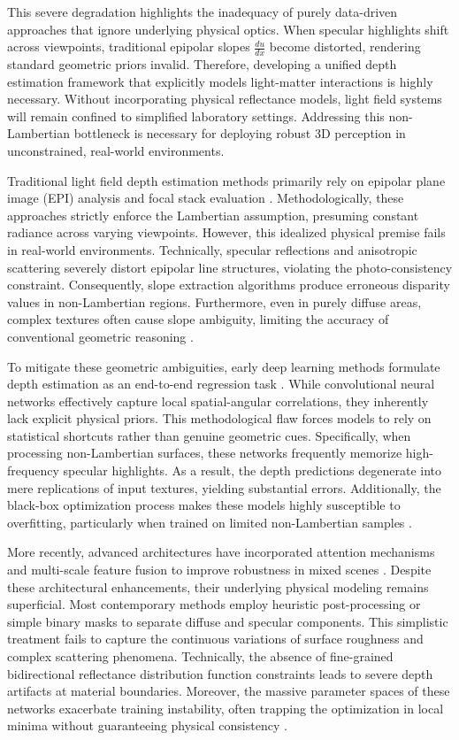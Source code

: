\documentclass[lettersize,journal]{IEEEtran}
\begin{document}
This severe degradation highlights the inadequacy of purely data-driven approaches that ignore underlying physical optics. When specular highlights shift across viewpoints, traditional epipolar slopes $\frac{du}{dx}$ become distorted, rendering standard geometric priors invalid. Therefore, developing a unified depth estimation framework that explicitly models light-matter interactions is highly necessary. Without incorporating physical reflectance models, light field systems will remain confined to simplified laboratory settings. Addressing this non-Lambertian bottleneck is necessary for deploying robust 3D perception in unconstrained, real-world environments.

Traditional light field depth estimation methods primarily rely on epipolar plane image (EPI) analysis and focal stack evaluation \cite{epiepi}. Methodologically, these approaches strictly enforce the Lambertian assumption, presuming constant radiance across varying viewpoints. However, this idealized physical premise fails in real-world environments. Technically, specular reflections and anisotropic scattering severely distort epipolar line structures, violating the photo-consistency constraint. Consequently, slope extraction algorithms produce erroneous disparity values in non-Lambertian regions. Furthermore, even in purely diffuse areas, complex textures often cause slope ambiguity, limiting the accuracy of conventional geometric reasoning \cite{slopeslope}.

To mitigate these geometric ambiguities, early deep learning methods formulate depth estimation as an end-to-end regression task \cite{endend}. While convolutional neural networks effectively capture local spatial-angular correlations, they inherently lack explicit physical priors. This methodological flaw forces models to rely on statistical shortcuts rather than genuine geometric cues. Specifically, when processing non-Lambertian surfaces, these networks frequently memorize high-frequency specular highlights. As a result, the depth predictions degenerate into mere replications of input textures, yielding substantial errors. Additionally, the black-box optimization process makes these models highly susceptible to overfitting, particularly when trained on limited non-Lambertian samples .

More recently, advanced architectures have incorporated attention mechanisms and multi-scale feature fusion to improve robustness in mixed scenes \cite{attentionatten}. Despite these architectural enhancements, their underlying physical modeling remains superficial. Most contemporary methods employ heuristic post-processing or simple binary masks to separate diffuse and specular components. This simplistic treatment fails to capture the continuous variations of surface roughness and complex scattering phenomena. Technically, the absence of fine-grained bidirectional reflectance distribution function constraints leads to severe depth artifacts at material boundaries. Moreover, the massive parameter spaces of these networks exacerbate training instability, often trapping the optimization in local minima without guaranteeing physical consistency \cite{trainingtrain}.
\end{document}
